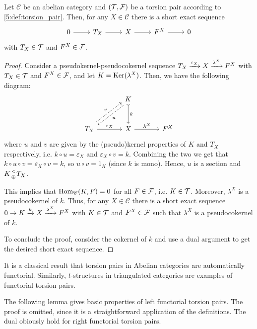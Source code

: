 \begin{lemma}
  Let $\mathscr{C}$ be an abelian category and $(\mathcal{T},\mathcal{F})$ be a torsion pair according to \ref{5:def:torsion_pair}. Then, for any $X\in\mathscr{C}$ there is a short exact sequence
  \begin{equation*}
    \begin{tikzcd}
      0\arrow{r}&T_X\arrow{r}&X\arrow{r}&F^X\arrow{r}&0
    \end{tikzcd}
  \end{equation*}
  with $T_X\in\mathcal{T}$ and $F^X\in\mathcal{F}$.
\end{lemma}

\begin{proof}
  Consider a pseudokernel-pseudocokernel sequence $T_X\xrightarrow{\varepsilon_X} X\xrightarrow{\lambda^X} F^X$ with $T_X\in \mathcal{T}$ and $F^X\in\mathcal{F}$, and let $K=\operatorname{Ker}(\lambda^X)$. Then, we have the following diagram:
  \begin{equation*}
    \begin{tikzcd}[column sep=large,row sep=large]
      & K\arrow[tail]{d}{k}\arrow[dashed,shift left]{dl}{u}
        &\\
      T_X\arrow{r}{\varepsilon_X}\arrow[dashed,shift left]{ur}{v}
      & X\arrow{r}{\lambda^X}
        & F^X
    \end{tikzcd}
  \end{equation*}
  where $u$ and $v$ are given by the (pseudo)kernel properties of $K$ and $T_X$ respectively, i.e. $k\circ u=\varepsilon_X$ and $\varepsilon_X\circ v = k$. Combining the two we get that $k\circ u\circ v = \varepsilon_X\circ v = k$, so $u\circ v=1_K$ (since $k$ is mono). Hence, $u$ is a section and $K {< \atop \oplus} T_X$.

  This implies that $\operatorname{Hom}_\mathscr{C}(K,F)=0$ for all $F\in\mathcal{F}$, i.e. $K\in\mathcal{T}$. Moreover, $\lambda^X$ is a pseudocokernel of $k$. Thus, for any $X\in\mathscr{C}$ there is a short exact sequence $0\to K\xrightarrow{k} X\xrightarrow{\lambda^X} F^X$ with $K\in\mathcal{T}$ and $F^X\in\mathcal{F}$ such that $\lambda^X$ is a pseudocokernel of $k$.

  To conclude the proof, consider the cokernel of $k$ and use a dual argument to get the desired short exact sequence.
\end{proof}


It is a classical result that torsion pairs in Abelian categories are automatically functorial. Similarly, $t$-structures in triangulated categories are examples of functorial torsion pairs.

The following lemma gives basic properties of left functorial torsion pairs. The proof is omitted, since it is a straightforward application of the definitions. The dual obiously hold for right functorial torsion pairs.

